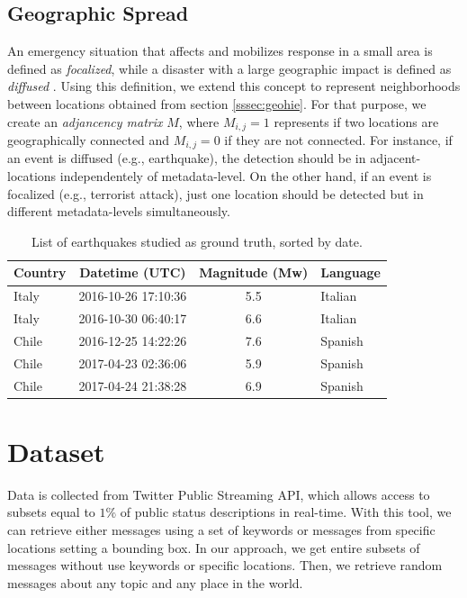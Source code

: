 \documentclass[sigconf]{acmart}
\begin{document}
\subsection{Geographic Spread}\label{sssec:geospread}

An emergency situation that affects and mobilizes response in a small area is defined as \textit{focalized}, while a disaster with a large geographic impact is defined as \textit{diffused} \cite{olteanu2015expect}. Using this definition, we extend this concept to represent neighborhoods between locations obtained from section \ref{sssec:geohie}. For that purpose, we create an \textit{adjancency matrix} $M$, where $M_{i,j} = 1$ represents if two locations are geographically connected and $M_{i,j} = 0$ if they are not connected. For instance, if an event is diffused (e.g., earthquake), the detection should be in adjacent-locations independentely of metadata-level. On the other hand, if an event is focalized (e.g., terrorist attack), just one location should be detected but in different metadata-levels simultaneously.


\begin{table}
	\caption{List of earthquakes studied as ground truth, sorted by date.}
	\label{tab:eqs}
	\begin{tabular}{lccl}
		\toprule
		Country&Datetime (UTC)&Magnitude (Mw)& Language\\
		\midrule
		Italy & 2016-10-26 17:10:36 & 5.5 & Italian \\
		Italy & 2016-10-30 06:40:17 & 6.6 & Italian\\
		Chile & 2016-12-25 14:22:26 & 7.6 & Spanish\\
		Chile & 2017-04-23 02:36:06 & 5.9 & Spanish\\
		Chile & 2017-04-24 21:38:28 & 6.9 & Spanish\\
		\midrule
	\end{tabular}
\end{table}

\section{Dataset}

Data is collected from Twitter Public Streaming API, which allows access to subsets equal to $1\%$ of public status descriptions in real-time. With this tool, we can retrieve either messages using a set of keywords or messages from specific locations setting a bounding box. In our approach, we get entire subsets of messages without use keywords or specific locations. Then, we retrieve random messages about any topic and any place in the world.
 
\end{document}
